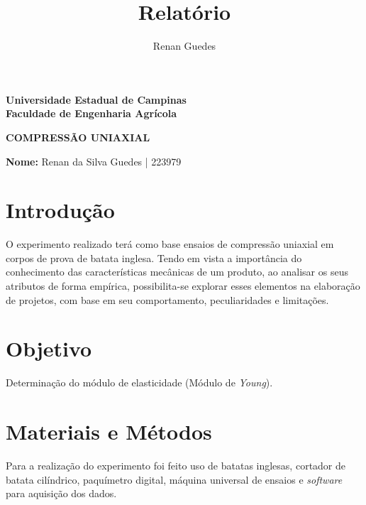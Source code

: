 \documentclass[a4paper, 12pt]{article}
\author{Renan Guedes}
\title{Relatório}
\begin{document}
	\begin{titlepage}
		\begin{center}
			\begin{large}
				\textbf{Universidade Estadual de Campinas}\\\vspace{1cm}
				\textbf{Faculdade de Engenharia Agrícola}\\
			\end{large}
			\vspace{10cm}
			\begin{Large}
				\uppercase{\textbf{Compressão Uniaxial}}\\
			\end{Large}
		\end{center}
		\vspace{5cm}
		\begin{large}
			\textbf{Nome:} Renan da Silva Guedes | 223979
		\end{large}
	\end{titlepage}
	
	\newpage
	
	\tableofcontents
	\listoffigures
	\listoftables
	
	\newpage
	
	\section{Introdução}
	
	O experimento realizado terá como base ensaios de compressão uniaxial em corpos de prova de batata inglesa. Tendo em vista a importância do conhecimento das características mecânicas de um produto, ao analisar os seus atributos de forma empírica, possibilita-se explorar esses elementos na elaboração de projetos, com base em seu comportamento, peculiaridades e limitações. 
	
	\section{Objetivo}
	
	Determinação do módulo de elasticidade (Módulo de \textit{Young}).
	
	\section{Materiais e Métodos}
	
	Para a realização do experimento foi feito uso de batatas inglesas, cortador de batata cilíndrico, paquímetro digital, máquina universal de ensaios e \textit{software} para aquisição dos dados.
\end{document}
